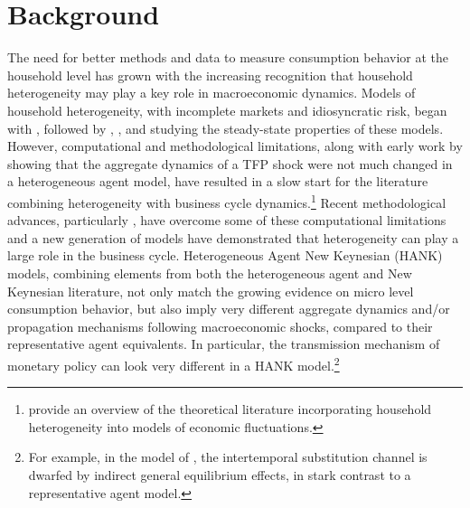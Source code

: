 \documentclass[titlepage]{\econtex}\newcommand{\texname}{ConsumptionHeterogeneity}
\begin{document}
	\section{Background}
	The need for better methods and data to measure consumption behavior at the household level has grown with the increasing recognition that household heterogeneity may play a key role in macroeconomic dynamics. Models of household heterogeneity, with incomplete markets and idiosyncratic risk, began with \cite{bewley_difficulty_1983}, followed by \cite{imrohoroglu_cost_1989}, \cite{huggett_risk_1993}, and \cite{aiyagari_uninsured_1994} studying the steady-state properties of these models. However, computational and methodological limitations, along with early work by \cite{krusell_income_1998} showing that the aggregate dynamics of a TFP shock were not much changed in a heterogeneous agent model, have resulted in a slow start for the literature combining heterogeneity with business cycle dynamics.\footnote{\cite{kaplan_microeconomic_2018} provide an overview of the theoretical literature incorporating household heterogeneity into models of economic fluctuations.} Recent methodological advances, particularly \cite{reiter_solving_2009}, have overcome some of these computational limitations and a new generation of models have demonstrated that heterogeneity can play a large role in the business cycle. Heterogeneous Agent New Keynesian (HANK) models, combining elements from both the heterogeneous agent and New Keynesian literature, not only match the growing evidence on micro level consumption behavior, but also imply very different aggregate dynamics and/or propagation mechanisms following macroeconomic shocks, compared to their representative agent equivalents. In particular, the transmission mechanism of monetary policy can look very different in a HANK model.\footnote{For example, in the model of \cite{kaplan_monetary_2016}, the intertemporal substitution channel is dwarfed by indirect general equilibrium effects, in stark contrast to a representative agent model.}
	
\end{document}
